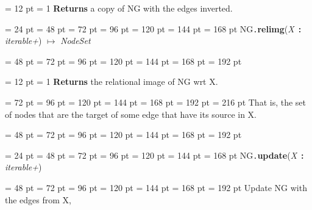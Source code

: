 {{{{{{\par \pagebreak[3.100000] \noindent \hangindent = 12 pt \hangafter = 1 
{\bf Returns \/} a copy of NG with the edges inverted.
\par}
\par}
\par}
\par}
\par}
{\par \noindent  \leftskip = 24 pt  \leftmargini = 48 pt  \leftmarginii = 72 pt  \leftmarginiii = 96 pt  \leftmarginiv = 120 pt  \leftmarginv = 144 pt  \leftmarginvi = 168 pt NG{\tt .\/}{\bf {\large {\bf relimg\/}}\/}({\em X\/}~{\bf :}  {\em iterable+\/}) \(\mapsto \)  {\em NodeSet\/}{\par \noindent
{\par \noindent  \leftskip = 48 pt  \leftmargini = 72 pt  \leftmarginii = 96 pt  \leftmarginiii = 120 pt  \leftmarginiv = 144 pt  \leftmarginv = 168 pt  \leftmarginvi = 192 pt {\par \noindent
{\par \pagebreak[3.100000] \noindent \hangindent = 12 pt \hangafter = 1 
{\bf Returns \/} the relational image of NG wrt X.\par}
{\par \noindent  \leftskip = 72 pt  \leftmargini = 96 pt  \leftmarginii = 120 pt  \leftmarginiii = 144 pt  \leftmarginiv = 168 pt  \leftmarginv = 192 pt  \leftmarginvi = 216 pt  That is, the set of nodes that are the target of some edge that have
       its source in X.\par}
\par}
\par}
{\par \noindent  \leftskip = 48 pt  \leftmargini = 72 pt  \leftmarginii = 96 pt  \leftmarginiii = 120 pt  \leftmarginiv = 144 pt  \leftmarginv = 168 pt  \leftmarginvi = 192 pt {\par \noindent
\par}
\par}
\par}
\par}
{\par \noindent  \leftskip = 24 pt  \leftmargini = 48 pt  \leftmarginii = 72 pt  \leftmarginiii = 96 pt  \leftmarginiv = 120 pt  \leftmarginv = 144 pt  \leftmarginvi = 168 pt NG{\tt .\/}{\bf {\large {\bf update\/}}\/}({\em X\/}~{\bf :}  {\em iterable+\/}){\par \noindent
{\par \noindent  \leftskip = 48 pt  \leftmargini = 72 pt  \leftmarginii = 96 pt  \leftmarginiii = 120 pt  \leftmarginiv = 144 pt  \leftmarginv = 168 pt  \leftmarginvi = 192 pt  Update NG with the edges from X,
}}}}
